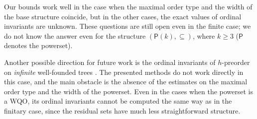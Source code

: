\documentclass[10pt,a4paper]{amsart}
\let \geq \geqslant
\begin{document}
Our bounds work well in the case when the maximal order type and the width of the base structure coincide, but in the other cases, the exact values of ordinal invariants are unknown. These questions are still open even in the finite case; we do not know the answer even for the structure $(\mathsf{P}(k), \subseteq)$, where $k \geq 3$ ($\mathsf{P}$ denotes the powerset).

Another possible direction for future work is the ordinal invariants of $h$-preorder on \textit{infinite} well-founded trees \cite{Selivanov2007}. The presented methods do not work directly in this case, and the main obstacle is the absence of the estimates on the maximal order type and the width of the powerset. Even in the cases when the powerset is a WQO, its ordinal invariants cannot be computed the same way as in the finitary case, since the residual sets have much less straightforward structure.



\end{document}
